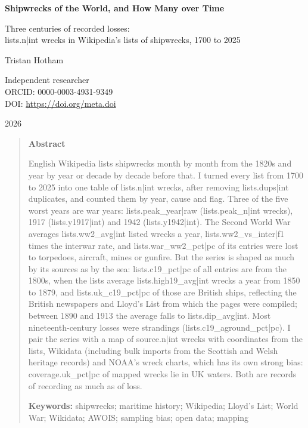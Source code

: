 \documentclass[11pt,a4paper]{article}
\begin{document}
\begin{center}
{\Large\bfseries Shipwrecks of the World, and How Many over Time\par}
\vspace{0.4em}
{\large Three centuries of recorded losses:\\{{lists.n|int}} wrecks in Wikipedia's lists of shipwrecks, 1700 to 2025\par}
\vspace{1.2em}
{\large Tristan Hotham\par}
\vspace{0.3em}
{\small Independent researcher\\
ORCID: 0000-0003-4931-9349\\
DOI: \href{https://doi.org/{{meta.doi}}}{https://doi.org/{{meta.doi}}}\par}
\vspace{0.8em}
2026
\end{center}

\begin{quote}
\small
\begin{center}\textbf{Abstract}\end{center}
English Wikipedia lists shipwrecks month by month from the 1820s and year by year or decade by decade before that. I turned every list from 1700 to 2025 into one table of {{lists.n|int}} wrecks, after removing {{lists.dups|int}} duplicates, and counted them by year, cause and flag. Three of the five worst years are war years: {{lists.peak_year|raw}} ({{lists.peak_n|int}} wrecks), 1917 ({{lists.y1917|int}}) and 1942 ({{lists.y1942|int}}). The Second World War averages {{lists.ww2_avg|int}} listed wrecks a year, {{lists.ww2_vs_inter|f1}} times the interwar rate, and {{lists.war_ww2_pct|pc}} of its entries were lost to torpedoes, aircraft, mines or gunfire. But the series is shaped as much by its sources as by the sea: {{lists.c19_pct|pc}} of all entries are from the 1800s, when the lists average {{lists.high19_avg|int}} wrecks a year from 1850 to 1879, and {{lists.uk_c19_pct|pc}} of those are British ships, reflecting the British newspapers and Lloyd's List from which the pages were compiled; between 1890 and 1913 the average falls to {{lists.dip_avg|int}}. Most nineteenth-century losses were strandings ({{lists.c19_aground_pct|pc}}). I pair the series with a map of {{source.n|int}} wrecks with coordinates from the lists, Wikidata (including bulk imports from the Scottish and Welsh heritage records) and NOAA's wreck charts, which has its own strong bias: {{coverage.uk_pct|pc}} of mapped wrecks lie in UK waters. Both are records of recording as much as of loss.

\textbf{Keywords:} shipwrecks; maritime history; Wikipedia; Lloyd's List; World War; Wikidata; AWOIS; sampling bias; open data; mapping
\end{quote}
\end{document}
